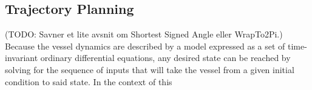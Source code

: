 \subsection{Trajectory Planning} \label{CHAP: Trajectory planning}
(TODO: Savner et lite avsnit om Shortest Signed Angle eller WrapTo2Pi.)
Because the vessel dynamics are described by a model expressed as a set of time-invariant ordinary differential equations, any desired state
can be reached by solving for the sequence of inputs that will take the vessel from a given initial condition to said state. In the context of this
